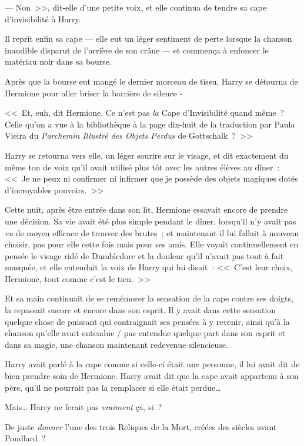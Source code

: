 --- Non~>>, dit-elle d'une petite voix, et elle continua de tendre sa cape d'invisibilité à Harry.

Il reprit enfin sa cape — elle eut un léger sentiment de perte lorsque la chanson inaudible disparut de l'arrière de son crâne — et commença à enfoncer le matériau noir dans sa bourse.

Après que la bourse eut mangé le dernier morceau de tissu, Harry se détourna de Hermione pour aller briser la barrière de silence -

<<~Et, euh, dit Hermione. Ce n'est pas \emph{la} Cape d'Invisibilité quand même~? Celle qu'on a vue à la bibliothèque à la page dix-huit de la traduction par Paula Vieira du \emph{Parchemin Illustré des Objets Perdus} de Gottschalk~?~>>

Harry se retourna vers elle, un léger sourire sur le visage, et dit exactement du même ton de voix qu'il avait utilisé plus tôt avec les autres élèves au dîner~: <<~Je ne peux ni confirmer ni infirmer que je possède des objets magiques dotés d'incroyables pouvoirs.~>>

\later

Cette nuit, après être entrée dans son lit, Hermione essayait encore de prendre une décision. Sa vie avait été plus simple pendant le dîner, lorsqu'il n'y avait pas \emph{eu} de moyen efficace de trouver des brutes~; et maintenant il lui fallait à nouveau choisir, pas pour elle cette fois mais pour ses amis. Elle voyait continuellement en pensée le visage ridé de Dumbledore et la douleur qu'il n'avait pas tout à fait masquée, et elle entendait la voix de Harry qui lui disait~: <<~C'est leur choix, Hermione, tout comme c'est le tien.~>>

Et sa main continuait de se remémorer la sensation de la cape contre ses doigts, la repassait encore et encore dans son esprit. Il y avait dans cette sensation quelque chose de puissant qui contraignait ses pensées à y revenir, ainsi qu'à la chanson qu'elle avait entendue / pas entendue quelque part dans son esprit et dans sa magie, une chanson maintenant redevenue silencieuse.

Harry avait parlé à la cape comme si celle-ci était une personne, il lui avait dit de bien prendre soin de Hermione. Harry avait dit que la cape avait appartenu à son père, qu'il ne pourrait pas la remplacer si elle était perdue…

Mais… Harry ne ferait pas \emph{vraiment} ça, si~?

De juste \emph{donner} l'une des trois Reliques de la Mort, créées des siècles avant Poudlard~?

